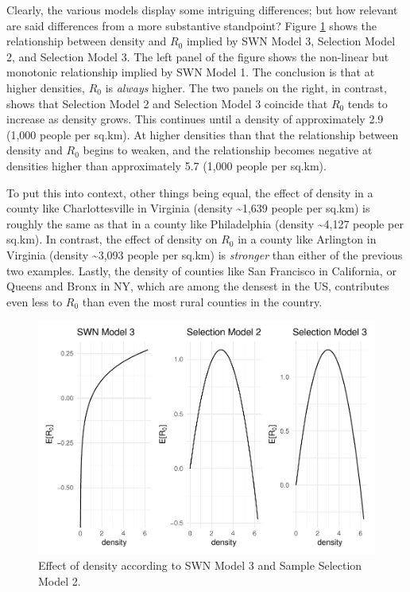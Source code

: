 \documentclass[]{elsarticle} %
\begin{document}
Clearly, the various models display some intriguing differences; but how
relevant are said differences from a more substantive standpoint? Figure
\ref{fig:comparison-results} shows the relationship between density and
\(R_0\) implied by SWN Model 3, Selection Model 2, and Selection Model
3. The left panel of the figure shows the non-linear but monotonic
relationship implied by SWN Model 1. The conclusion is that at higher
densities, \(R_0\) is \emph{always} higher. The two panels on the right,
in contrast, shows that Selection Model 2 and Selection Model 3 coincide
that \(R_0\) tends to increase as density grows. This continues until a
density of approximately 2.9 (1,000 people per sq.km). At higher
densities than that the relationship between density and \(R_0\) begins
to weaken, and the relationship becomes negative at densities higher
than approximately 5.7 (1,000 people per sq.km).

To put this into context, other things being equal, the effect of
density in a county like Charlottesville in Virginia (density
\textasciitilde1,639 people per sq.km) is roughly the same as that in a
county like Philadelphia (density \textasciitilde4,127 people per
sq.km). In contrast, the effect of density on \(R_0\) in a county like
Arlington in Virginia (density \textasciitilde3,093 people per sq.km) is
\emph{stronger} than either of the previous two examples. Lastly, the
density of counties like San Francisco in California, or Queens and
Bronx in NY, which are among the densest in the US, contributes even
less to \(R_0\) than even the most rural counties in the country.

\begin{figure}
\includegraphics[width=1\linewidth]{R0-Density-Reanalysis_files/figure-latex/comparison-results-1} \caption{\label{fig:comparison-results}Effect of density according to SWN Model 3 and Sample Selection Model 2.}\label{fig:comparison-results}
\end{figure}
\end{document}
